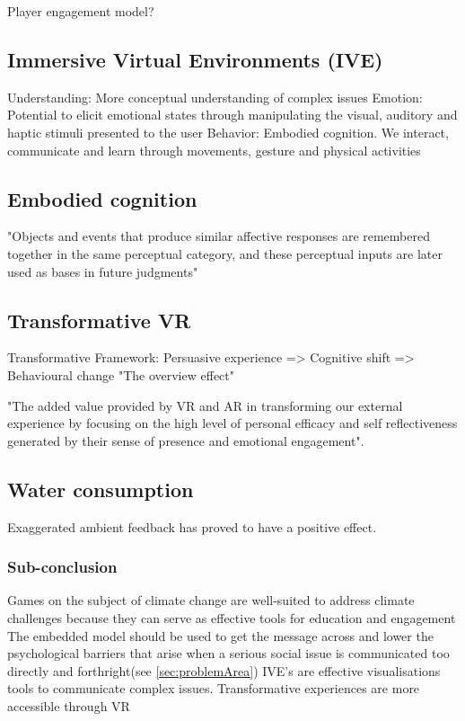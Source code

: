     Player engagement model?\cite{playerEngagement}
    
    \subsection{Immersive Virtual Environments (IVE)}
    Understanding: More conceptual understanding of complex issues\cite{vrEngagementClimateChange}
    Emotion: Potential to elicit emotional states through manipulating the visual, auditory and haptic stimuli presented to the user
    Behavior: Embodied cognition. We interact, communicate and learn through movements, gesture and physical activities\
    
    \subsection{Embodied cognition}
    "Objects and events that produce similar affective responses are remembered together in the same perceptual category, and these perceptual inputs are later used as bases in future judgments"\cite{ahn2011embodied}
    
    \subsection{Transformative VR}
    Transformative Framework:
    Persuasive experience => Cognitive shift => Behavioural change\cite{transformativeVR}
    "The overview effect"\cite{transformativeVR}
    
    "The added value provided by VR and AR in transforming our external experience by focusing on the high level of personal efficacy and self reflectiveness generated by their sense of presence and emotional engagement"\cite{riva2016transforming}.
    
    \subsection{Water consumption}
    Exaggerated ambient feedback has proved to have a positive effect.\cite{waterConsumption}
    
    \subsubsection{Sub-conclusion}
    Games on the subject of climate change are well-suited to address climate challenges because they can serve as effective tools for education and engagement\cite{gamesAsToolsForEngagement}
    The embedded model should be used to get the message across and lower the psychological barriers that arise when a serious social issue is communicated too directly and forthright(see \autoref{sec:problemArea})
    IVE's are effective visualisations tools to communicate complex issues.
    Transformative experiences are more accessible through VR

